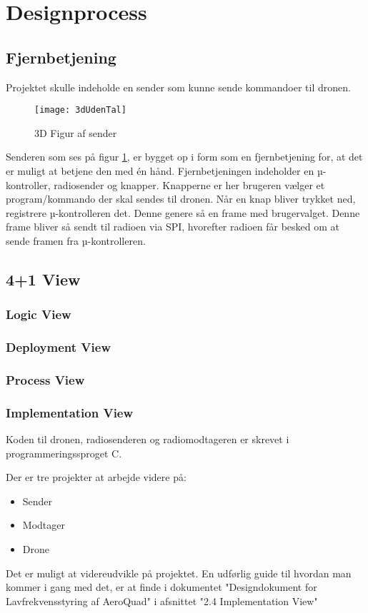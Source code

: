 \documentclass[Main]{subfiles}
\begin{document}
\section{Designprocess}



\subsection{Fjernbetjening}

Projektet skulle indeholde en sender som kunne sende kommandoer til dronen.

\begin{figure}[H]
\centering
\texttt{[image: 3dUdenTal]}
\caption{3D Figur af sender}
\label{Fig:3dUdenTal}
\end{figure}


Senderen som ses på figur \ref{Fig:3dUdenTal}, er bygget op i form som en fjernbetjening for, at det er muligt at betjene den med én hånd.
Fjernbetjeningen indeholder en µ-kontroller, radiosender og knapper.
Knapperne er her brugeren vælger et program/kommando der skal sendes til dronen. Når en knap bliver trykket ned, registrere µ-kontrolleren det. Denne genere så en frame med brugervalget. Denne frame bliver så sendt til radioen via SPI, hvorefter radioen får besked om at sende framen fra µ-kontrolleren.

\subsection{4+1 View}


\subsubsection*{Logic View}


\subsubsection*{Deployment View}


\subsubsection*{Process View}


\subsubsection*{Implementation View}

Koden til dronen, radiosenderen og radiomodtageren er skrevet i programmeringssproget C.

Der er tre projekter at arbejde videre på:

\begin{itemize}
\item Sender
\item Modtager
\item Drone
\end{itemize}

Det er muligt at videreudvikle på projektet.
En udførlig guide til hvordan man kommer i gang med det, er at finde i  dokumentet "Designdokument for Lavfrekvensstyring af AeroQuad" i afsnittet "2.4 Implementation View" 
\end{document}
